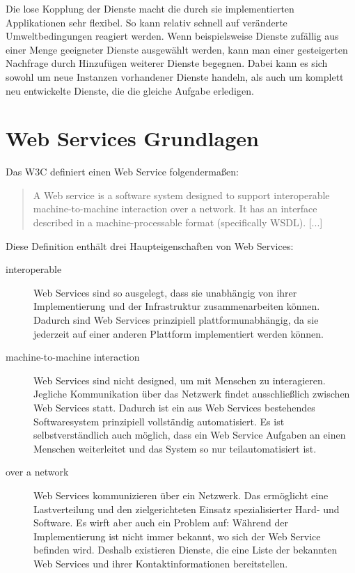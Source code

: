 \documentclass[runningheads]{llncs}
\newcommand{\germanquote}[1]{\glqq{}#1\grqq{}}
\begin{document}
    Die lose Kopplung der Dienste macht die durch sie implementierten Applikationen sehr flexibel.
    So kann relativ schnell auf veränderte Umweltbedingungen reagiert werden. Wenn beispielsweise
    Dienste zufällig aus einer Menge geeigneter Dienste ausgewählt werden, kann man einer
    gesteigerten Nachfrage durch Hinzufügen weiterer Dienste begegnen. Dabei kann es sich sowohl um
    neue Instanzen vorhandener Dienste handeln, als auch um komplett neu entwickelte Dienste, die
    die gleiche Aufgabe erledigen.


  \label{ws}
  \section{Web Services Grundlagen}
  \nocite{wk_ws}
    Das W3C definiert einen \germanquote{Web Service} folgendermaßen:
    \begin{quote}
      A Web service is a software system designed to support interoperable machine-to-machine interaction
      over a network. It has an interface described in a machine-processable format (specifically
      WSDL). [...]\cite{w3c_wsgloss_ws}
    \end{quote}

    Diese Definition enthält drei Haupteigenschaften von Web Services:
    \begin{description}
      \item[interoperable]
        Web Services sind so ausgelegt, dass sie unabhängig von ihrer Implementierung und der
        Infrastruktur zusammenarbeiten können. Dadurch sind Web Services prinzipiell
        plattformunabhängig, da sie jederzeit auf einer anderen Plattform implementiert werden
        können.
      \item[machine-to-machine interaction]
        Web Services sind nicht designed, um mit Menschen zu interagieren. Jegliche Kommunikation
        über das Netzwerk findet ausschließlich zwischen Web Services statt. Dadurch ist ein aus
        Web Services bestehendes Softwaresystem prinzipiell vollständig automatisiert. Es ist
        selbstverständlich auch möglich, dass ein Web Service Aufgaben an einen Menschen
        weiterleitet und das System so nur teilautomatisiert ist.
      \item[over a network]
        Web Services kommunizieren über ein Netzwerk. Das ermöglicht eine Lastverteilung und den
        zielgerichteten Einsatz spezialisierter Hard- und Software. Es wirft aber auch ein Problem
        auf: Während der Implementierung ist nicht immer bekannt, wo sich der Web Service befinden
        wird. Deshalb existieren Dienste, die eine Liste der bekannten Web Services und ihrer
        Kontaktinformationen bereitstellen.
    \end{description}
\end{document}
